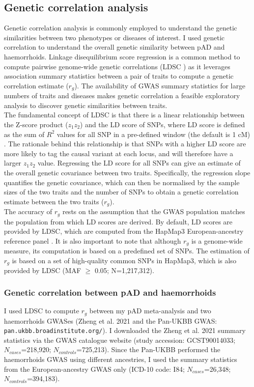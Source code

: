 \subsection{Genetic correlation analysis}
Genetic correlation analysis is commonly employed to understand the genetic similarities between two phenotypes or diseases of interest. I used genetic correlation to understand the overall genetic similarity between pAD and haemorrhoids. Linkage disequilibrium score regression is a common method to compute pairwise genome-wide genetic correlations (LDSC \cite{Bulik-Sullivan2015-fk}) as it leverages association summary statistics between a pair of traits to compute a genetic correlation estimate ($r_{g}$). The availability of GWAS summary statistics for large numbers of traits and diseases makes genetic correlation a feasible exploratory analysis to discover genetic similarities between traits.\\

The fundamental concept of LDSC is that there is a linear relationship between the Z-score product ($z_{1}z_{2}$) and the LD score of SNPs, where LD score is defined as the sum of $R^{2}$ values for all SNP in a pre-defined window (the default is 1 cM) \cite{Bulik-Sullivan2015-ts}. The rationale behind this relationship is that SNPs with a higher LD score are more likely to tag the causal variant at each locus, and will therefore have a larger $z_{1}z_{2}$ value. Regressing the LD score for all SNPs can give an estimate of the overall genetic covariance between two traits. Specifically, the regression slope quantifies the genetic covariance, which can then be normalised by the sample sizes of the two traits and the number of SNPs to obtain a genetic correlation estimate between the two traits ($r_{g}$).\\

The accuracy of $r_{g}$ rests on the assumption that the GWAS population matches the population from which LD scores are derived. By default, LD scores are provided by LDSC, which are computed from the HapMap3 European-ancestry reference panel \cite{hapmap}. It is also important to note that although $r_{g}$ is a genome-wide measure, its computation is based on a predefined set of SNPs. The estimation of $r_{g}$ is based on a set of high-quality common SNPs in HapMap3, which is also provided by LDSC (MAF $\geq$ 0.05; N=1,217,312).

\subsubsection{Genetic correlation between pAD and haemorrhoids}
I used LDSC to compute $r_{g}$ between my pAD meta-analysis and two haemorrhoids GWASes (Zheng et al. 2021 \cite{Zheng2021-ss} and the Pan-UKBB GWAS: \Verb+pan.ukbb.broadinstitute.org/+). I downloaded the Zheng et al. 2021 summary statistics via the GWAS catalogue website (study accession: GCST90014033; $N_{cases}$=218,920; $N_{controls}$=725,213). Since the Pan-UKBB performed the haemorrhoids GWAS using different ancestries, I used the summary statistics from the European-ancestry GWAS only (ICD-10 code: I84; $N_{cases}$=26,348; $N_{controls}$=394,183). \\

